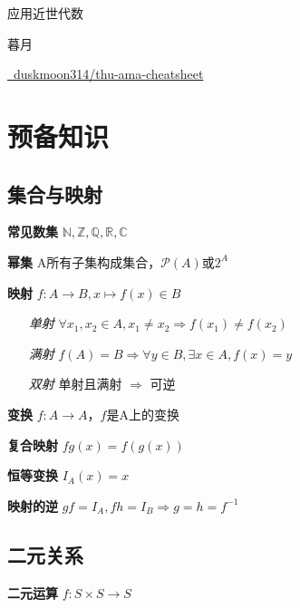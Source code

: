 \documentclass[b4paper, 10pt]{ctexart}
\newcommand*{\setN}{\mathbb{N}}
\newcommand*{\setZ}{\mathbb{Z}}
\newcommand*{\setQ}{\mathbb{Q}}
\newcommand*{\setR}{\mathbb{R}}
\newcommand*{\setC}{\mathbb{C}}
\newcommand*{\powerset}[1]{\mathscr{P}(#1)}
\newcommand*{\impl}{\Rightarrow}
\begin{document}
\begin{multicols}{3}
    \begin{center}
        {\Large 应用近世代数}

        暮月

        \vspace*{-0.5em}

        \href{https://github.com/duskmoon314/thu-ama-cheatsheet}{\faGithub \  duskmoon314/thu-ama-cheatsheet}

        \vspace*{-1.5em}
    \end{center}

    \section{预备知识}

    \subsection{集合与映射}

    \textbf{常见数集} $\setN, \setZ, \setQ, \setR, \setC$

    \textbf{幂集} A所有子集构成集合，$\powerset{A}$或$2^A$

    \textbf{映射} $f: A \to B, x \mapsto f(x) \in B$

    \begin{itemize}
        \item[\emph{单射}] $\forall x_1, x_2 \!\in\! A, x_1 \!\neq\! x_2 \!\impl\! f(x_1) \!\neq\! f(x_2) $
        \item[\emph{满射}] $f(A) \! = \! B \impl \forall y \!\in\! B, \exists x \!\in\! A, f(x) = y$
        \item[\emph{双射}] 单射且满射 $\impl$ 可逆
    \end{itemize}

    \textbf{变换} $f: A \to A$，$f$是A上的变换

    \textbf{复合映射} $fg(x) = f(g(x))$

    \textbf{恒等变换} $I_A(x) = x$

    \textbf{映射的逆} $gf \! = \! I_A, fh \! = \! I_B \impl g \! = \! h \!= \! f^{-1}$

    \subsection{二元关系}

    \textbf{二元运算} $f: S \times S \to S$


\end{multicols}
\end{document}
